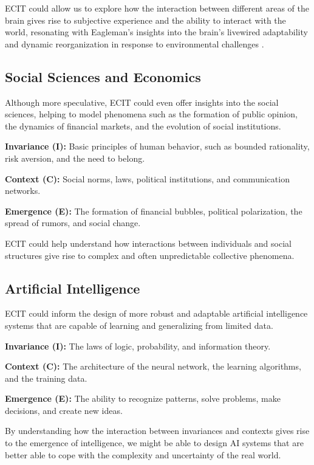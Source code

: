 \documentclass{article}
\begin{document}
ECIT could allow us to explore how the interaction between different areas of the brain gives rise to subjective experience and the ability to interact with the world, resonating with Eagleman’s insights into the brain’s livewired adaptability and dynamic reorganization in response to environmental challenges \cite{Eagleman2020}.

\subsection{Social Sciences and Economics}

Although more speculative, ECIT could even offer insights into the social sciences, helping to model phenomena such as the formation of public opinion, the dynamics of financial markets, and the evolution of social institutions.

\textbf{Invariance (I):} Basic principles of human behavior, such as bounded rationality, risk aversion, and the need to belong.

\textbf{Context (C):} Social norms, laws, political institutions, and communication networks.

\textbf{Emergence (E):} The formation of financial bubbles, political polarization, the spread of rumors, and social change.

ECIT could help understand how interactions between individuals and social structures give rise to complex and often unpredictable collective phenomena.

\subsection{Artificial Intelligence}

ECIT could inform the design of more robust and adaptable artificial intelligence systems that are capable of learning and generalizing from limited data.

\textbf{Invariance (I):} The laws of logic, probability, and information theory.

\textbf{Context (C):} The architecture of the neural network, the learning algorithms, and the training data.

\textbf{Emergence (E):} The ability to recognize patterns, solve problems, make decisions, and create new ideas.

By understanding how the interaction between invariances and contexts gives rise to the emergence of intelligence, we might be able to design AI systems that are better able to cope with the complexity and uncertainty of the real world.
\end{document}
